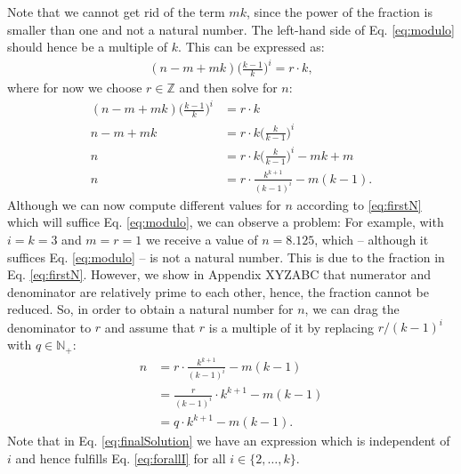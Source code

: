 \documentclass[11pt]{article}
\begin{document}
Note that we cannot get rid of the term $mk$, since the power of the fraction is smaller than one and not a natural number. The left-hand side of Eq. \eqref{eq:modulo} should hence be a multiple of $k$. This can be expressed as:
\begin{align}
	(n-m+mk)\bigg(\frac{k-1}{k} \bigg)^i = r\cdot k, 
\end{align}
where for now we choose $r \in \mathbb{Z}$ and then solve for $n$:
\begin{align}
	(n-m+mk)\bigg(\frac{k-1}{k} \bigg)^i &= r\cdot k \\
	n-m+mk &= r\cdot k \bigg(\frac{k}{k-1} \bigg)^i \\
	n &= r\cdot k \bigg(\frac{k}{k-1} \bigg)^i - mk + m \\
	n &= r\cdot \frac{k^{k+1}}{(k-1)^i} - m(k -1) \label{eq:firstN}.
\end{align}
Although we can now compute different values for $n$ according to \eqref{eq:firstN} which will suffice Eq. \eqref{eq:modulo}, we can observe a problem: For example, with $i=k=3$ and $m=r=1$ we receive a value of $n=8.125$, which -- although it suffices Eq. \eqref{eq:modulo} -- is not a natural number. This is due to the fraction in Eq. \eqref{eq:firstN}. However, we show in Appendix XYZABC that numerator and denominator are relatively prime to each other, hence, the fraction cannot be reduced. So, in order to obtain a natural number for $n$, we can drag the denominator to $r$ and assume that $r$ is a multiple of it by replacing $r/(k-1)^i$ with $q \in \mathbb{N_+}$:
\begin{align}
	n &= r\cdot \frac{k^{k+1}}{(k-1)^i} - m(k -1) \\
	&= \frac{r}{(k-1)^i} \cdot k^{k+1} - m(k -1) \\
	&= q \cdot k^{k+1} - m(k -1). \label{eq:finalSolution}
\end{align}
Note that in Eq. \eqref{eq:finalSolution} we have an expression which is independent of $i$ and hence fulfills Eq. \eqref{eq:forallI} for all $i \in \{2, \ldots, k \}$.
\end{document}
